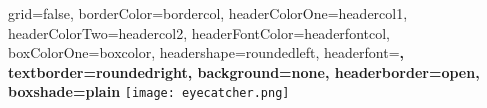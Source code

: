 \documentclass[a0paper,fontscale=0.4125,landscape]{baposter} %
\begin{document}



\begin{poster}{
	grid=false,
	borderColor=bordercol,
	headerColorOne=headercol1,
	headerColorTwo=headercol2,
	headerFontColor=headerfontcol,
	boxColorOne=boxcolor,
	headershape=roundedleft,
	headerfont=\Large\sf\bf,
	textborder=roundedright,
	background=none,
	headerborder=open,
  boxshade=plain
}
{
	\texttt{[image: eyecatcher.png]}
}
{\sf\bf
	\\} 
 { 
 \vspace{0.4em} 
 	{
 		}
}
{
\setlength\fboxsep{0pt}
\setlength\fboxrule{0pt}
	}
\end{poster}
\end{document}
